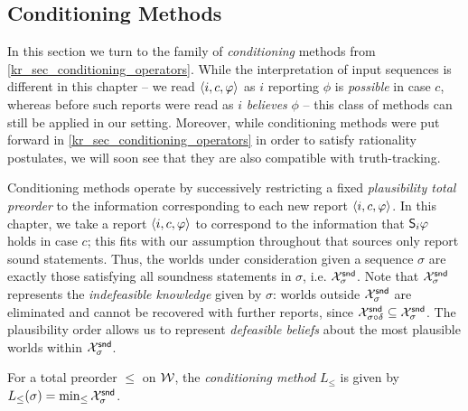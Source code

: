 \subsection{Conditioning Methods}

In this section we turn to the family of \emph{conditioning} methods from
\cref{kr_sec_conditioning_operators}.
While the interpretation of input sequences is different in this chapter -- we
read $\tuple{i, c, \phi}$ as $i$ reporting $\phi$ is \emph{possible} in case
$c$, whereas before such reports were read as $i$
\emph{believes} $\phi$ -- this class of methods can still be applied in our
setting. Moreover, while conditioning methods were put forward in
\cref{kr_sec_conditioning_operators} in order to satisfy rationality
postulates, we will soon see that they are also compatible with truth-tracking.

Conditioning methods operate by successively restricting a fixed
\emph{plausibility total preorder} to the information corresponding to each
new report $\tuple{i, c, \phi}$. In this chapter, we take a report $\tuple{i, c,
\phi}$ to correspond to the information that $\S_i\phi$ holds in case $c$; this
fits with our assumption throughout that sources only report sound
statements.\footnotemark{}
%
Thus, the worlds under
consideration given a sequence $\sigma$ are exactly those satisfying all
soundness statements in $\sigma$, i.e. $\Xsnd_\sigma$. Note that $\Xsnd_\sigma$
represents the \emph{indefeasible knowledge} given by $\sigma$: worlds outside
$\Xsnd_\sigma$ are eliminated and cannot be recovered with further reports,
since $\Xsnd_{\sigma \seqappend \delta} \subseteq \Xsnd_\sigma$. The
plausibility order allows us to represent \emph{defeasible beliefs} about the
most plausible worlds within $\Xsnd_\sigma$.


\begin{definition}
    \label{tt_def_conditioning_method}
    For a total preorder $\le$ on $\worlds$, the \emph{conditioning method}
    $L_{\le}$ is given by $L_{\le}(\sigma) = \min_{\le}{\Xsnd_\sigma}$.
\end{definition}

